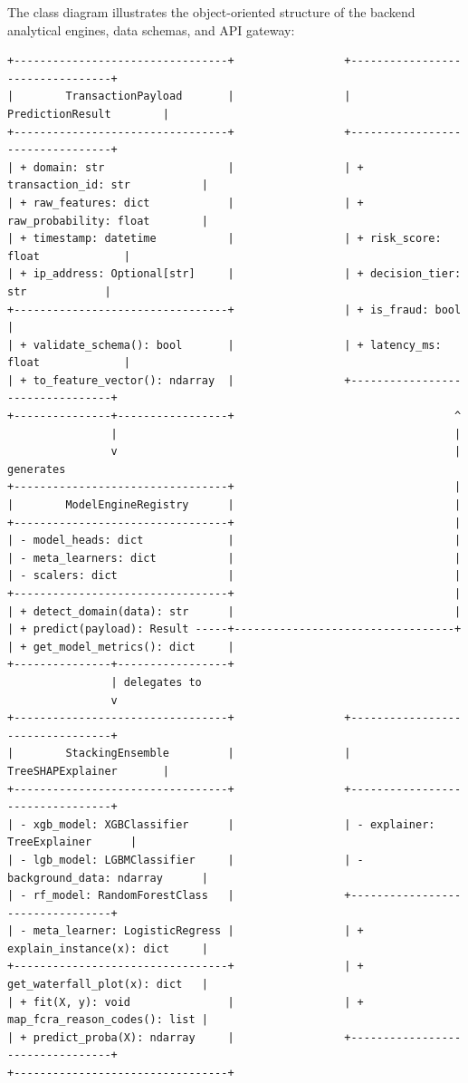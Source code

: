 \documentclass[12pt,a4paper,oneside]{report}
\begin{document}
The class diagram illustrates the object-oriented structure of the backend analytical engines, data schemas, and API gateway:


\begin{lstlisting}
+---------------------------------+                 +---------------------------------+
|        TransactionPayload       |                 |         PredictionResult        |
+---------------------------------+                 +---------------------------------+
| + domain: str                   |                 | + transaction_id: str           |
| + raw_features: dict            |                 | + raw_probability: float        |
| + timestamp: datetime           |                 | + risk_score: float             |
| + ip_address: Optional[str]     |                 | + decision_tier: str            |
+---------------------------------+                 | + is_fraud: bool                |
| + validate_schema(): bool       |                 | + latency_ms: float             |
| + to_feature_vector(): ndarray  |                 +---------------------------------+
+---------------+-----------------+                                  ^
                |                                                    |
                v                                                    | generates
+---------------------------------+                                  |
|        ModelEngineRegistry      |                                  |
+---------------------------------+                                  |
| - model_heads: dict             |                                  |
| - meta_learners: dict           |                                  |
| - scalers: dict                 |                                  |
+---------------------------------+                                  |
| + detect_domain(data): str      |                                  |
| + predict(payload): Result -----+----------------------------------+
| + get_model_metrics(): dict     |
+---------------+-----------------+
                | delegates to
                v
+---------------------------------+                 +---------------------------------+
|        StackingEnsemble         |                 |         TreeSHAPExplainer       |
+---------------------------------+                 +---------------------------------+
| - xgb_model: XGBClassifier      |                 | - explainer: TreeExplainer      |
| - lgb_model: LGBMClassifier     |                 | - background_data: ndarray      |
| - rf_model: RandomForestClass   |                 +---------------------------------+
| - meta_learner: LogisticRegress |                 | + explain_instance(x): dict     |
+---------------------------------+                 | + get_waterfall_plot(x): dict   |
| + fit(X, y): void               |                 | + map_fcra_reason_codes(): list |
| + predict_proba(X): ndarray     |                 +---------------------------------+
+---------------------------------+
\end{lstlisting}
\end{document}
